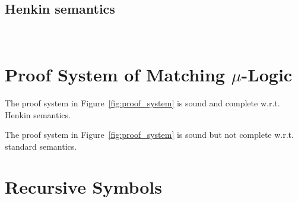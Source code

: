 \documentclass{amsart}
\begin{document}
\subsection{Henkin semantics}
\label{sec:hnk_semantics}

\quad\\

\section{Proof System of Matching $\mu$-Logic}



\begin{theorem}
The proof system in Figure~\ref{fig:proof_system} is sound and complete
w.r.t. Henkin semantics.
\end{theorem}

\begin{theorem}
The proof system in Figure~\ref{fig:proof_system} is sound but not complete
w.r.t. standard semantics.
\end{theorem}

\section{Recursive Symbols}
\label{sec:recursive_symbols}
\end{document}
